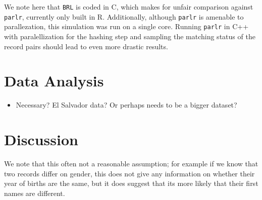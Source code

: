 \documentclass[
  12pt,
]{article}
\providecommand{\tightlist}{%
  \setlength{\itemsep}{0pt}\setlength{\parskip}{0pt}}
\begin{document}
We note here that \texttt{BRL} is coded in C, which makes for unfair
comparison against \texttt{parlr}, currently only built in R.
Additionally, although \texttt{parlr} is amenable to parallezation, this
simulation was run on a single core. Running \texttt{parlr} in C++ with
paralellization for the hashing step and sampling the matching status of
the record pairs should lead to even more drastic results.

\hypertarget{data-analysis}{%
\section{Data Analysis}\label{data-analysis}}

\begin{itemize}
\tightlist
\item
  Necessary? El Salvador data? Or perhaps needs to be a bigger dataset?
\end{itemize}

\hypertarget{discussion}{%
\section{Discussion}\label{discussion}}

We note that this often not a reasonable assumption; for example if we
know that two records differ on gender, this does not give any
information on whether their year of births are the same, but it does
suggest that its more likely that their first names are different.
\end{document}
